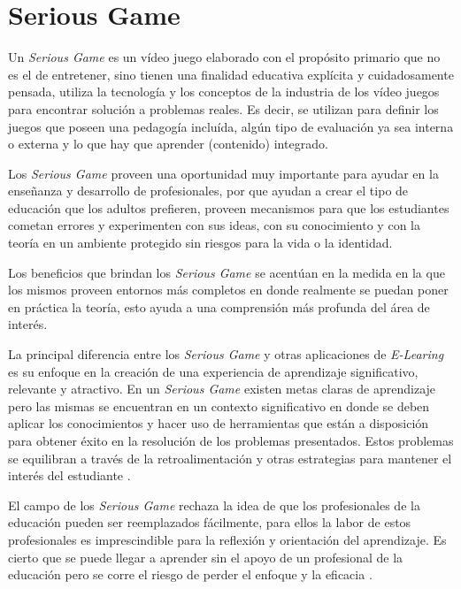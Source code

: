 \section{Serious Game}
\label{sec:tics_JUEGO_SERIO}

Un \emph{Serious Game} es un vídeo juego elaborado con el propósito primario que
no es el de entretener\cite{sg:aoverview}, sino tienen una finalidad educativa
explícita y cuidadosamente pensada, utiliza la tecnología y los conceptos de la
industria de los vídeo juegos para encontrar solución a problemas reales. Es
decir, se utilizan para definir los juegos que poseen una pedagogía incluída,
algún tipo de evaluación ya sea interna o externa y lo que hay que aprender
(contenido) integrado\cite{damien:sg}.

Los \emph{Serious Game} proveen una oportunidad muy importante para ayudar en la
enseñanza y desarrollo de profesionales, por que ayudan a crear el tipo de
educación que los adultos prefieren, proveen mecanismos para que los estudiantes
cometan errores y experimenten con sus ideas, con su conocimiento y con la
teoría en un ambiente protegido sin riesgos para la vida o la identidad. 

Los beneficios que brindan los \emph{Serious Game} se acentúan en la medida en
la que los mismos proveen entornos más completos en donde realmente se puedan
poner en práctica la teoría, esto ayuda a una comprensión más profunda del área
de interés.

La principal diferencia entre los \emph{Serious Game} y otras aplicaciones de
\emph{E-Learing} es su enfoque en la creación de una experiencia de aprendizaje
significativo, relevante y atractivo. En un \emph{Serious Game} existen metas
claras de aprendizaje pero las mismas se encuentran en un contexto significativo
en donde se deben aplicar los conocimientos y hacer uso de herramientas que
están a disposición para obtener éxito en la resolución de los problemas
presentados. Estos problemas se equilibran a través de la retroalimentación y
otras estrategias para mantener el interés del estudiante
\cite{papertian:const}.

El campo de los \emph{Serious Game} rechaza la idea de que los profesionales de
la educación pueden ser reemplazados fácilmente, para ellos la labor de estos
profesionales es imprescindible para la reflexión y orientación del aprendizaje.
Es cierto que se puede llegar a aprender sin el apoyo de un profesional de la
educación pero se corre el riesgo de perder el enfoque y la eficacia
\cite{elearning:seiousgames}. 

